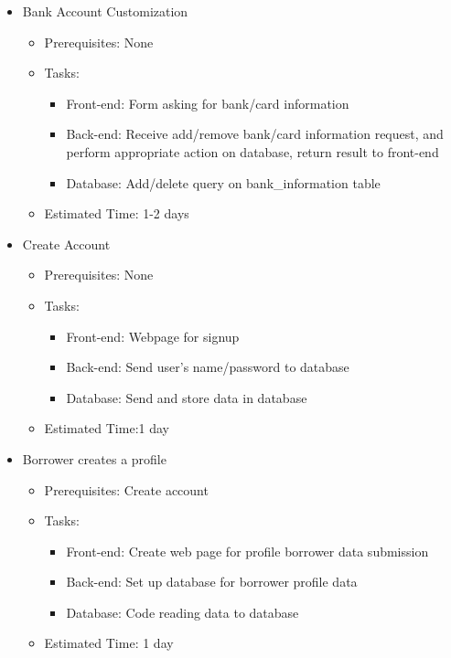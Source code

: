 \begin{itemize}
	\item Bank Account Customization
	\begin{itemize}
		\item Prerequisites: None
		\item Tasks:
		\begin{itemize}
			\item Front-end: Form asking for bank/card information
			\item Back-end: Receive add/remove bank/card information request, and perform appropriate action on database, return result to front-end
			\item Database: Add/delete query on bank\_information table
		\end{itemize}
		\item Estimated Time: 1-2 days
	\end{itemize}

	\item Create Account
	\begin{itemize}
		\item Prerequisites: None
		\item Tasks:
		\begin{itemize}
			\item Front-end: Webpage for signup
			\item Back-end: Send user's name/password to database
			\item Database: Send and store data in database
		\end{itemize}
		\item Estimated Time:1 day
	\end{itemize}

	\item Borrower creates a profile
	\begin{itemize}
		\item Prerequisites: Create account 
		\item Tasks:
		\begin{itemize}
			\item Front-end: Create web page for profile borrower data submission
			\item Back-end: Set up database for borrower profile data
			\item Database: Code reading data to database
		\end{itemize}
		\item Estimated Time: 1 day
	\end{itemize}


\end{itemize}
